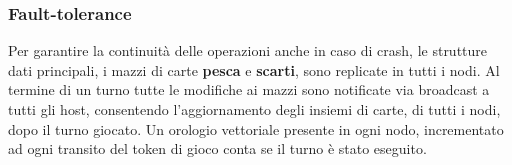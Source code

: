 \documentclass[10pt,a4paper]{article}
\begin{document}
\subsubsection{Fault-tolerance}
Per garantire la continuità delle operazioni anche in caso di crash, le strutture dati principali, i mazzi di carte \textbf{pesca} e \textbf{scarti}, sono replicate in tutti i nodi. Al termine di un turno tutte le modifiche ai mazzi sono notificate via broadcast a tutti gli host, consentendo l'aggiornamento degli insiemi di carte, di tutti i nodi, dopo il turno giocato. Un orologio vettoriale presente in ogni nodo, incrementato ad ogni transito del token di gioco conta se il turno è stato eseguito.


\end{document}
